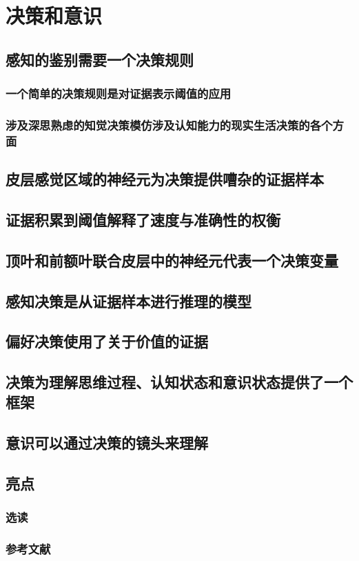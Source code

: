 \chapter{决策和意识}

\section{感知的鉴别需要一个决策规则}

\subsection{一个简单的决策规则是对证据表示阈值的应用}
\subsection{涉及深思熟虑的知觉决策模仿涉及认知能力的现实生活决策的各个方面}

\section{皮层感觉区域的神经元为决策提供嘈杂的证据样本}

\section{证据积累到阈值解释了速度与准确性的权衡}

\section{顶叶和前额叶联合皮层中的神经元代表一个决策变量}

\section{感知决策是从证据样本进行推理的模型}

\section{偏好决策使用了关于价值的证据}

\section{决策为理解思维过程、认知状态和意识状态提供了一个框架}

\section{意识可以通过决策的镜头来理解}


\section{亮点}
\subsection{选读}
\subsection{参考文献}